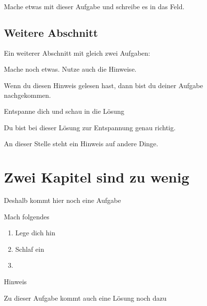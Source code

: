 \documentclass[12pt,a4paper,parskip=half,chapterprefix,bibliography=totoc,footheight=57pt,numbers=noendperiod]{scrreprt}
\begin{document}
        \begin{aufgabe}
            Mache etwas mit dieser Aufgabe und schreibe es in das Feld.
            \TextFeld{3cm}
        \end{aufgabe}

    \section{Weitere Abschnitt}
        Ein weiterer Abschnitt mit gleich zwei Aufgaben:
        \begin{aufgabe}
            Mache noch etwas. Nutze auch die Hinweise.
            \begin{bearbeitungshinweis}
                Wenn du diesen Hinweis gelesen hast, dann bist du deiner Aufgabe nachgekommen.
            \end{bearbeitungshinweis}
        \end{aufgabe}
        \begin{aufgabe}
            Entspanne dich und schau in die Lösung
        \end{aufgabe}
        \begin{loesung}
            Du bist bei dieser Lösung zur Entspannung genau richtig.
        \end{loesung}

        \begin{hinweisBox}
            An dieser Stelle steht ein Hinweis auf andere Dinge.
        \end{hinweisBox}


\chapter{Zwei Kapitel sind zu wenig}
    Deshalb kommt hier noch eine Aufgabe
    \begin{aufgabe} Mach folgendes
        \begin{enumerate}
            \item Lege dich hin
            \item Schlaf ein
            \item
        \end{enumerate}
        \TextFeld{3cm}
    \end{aufgabe}
    \begin{bearbeitungshinweis}
        Hinweis
    \end{bearbeitungshinweis}
    \begin{loesung}
        Zu dieser Aufgabe kommt auch eine Lösung noch dazu
    \end{loesung}
\end{document}
